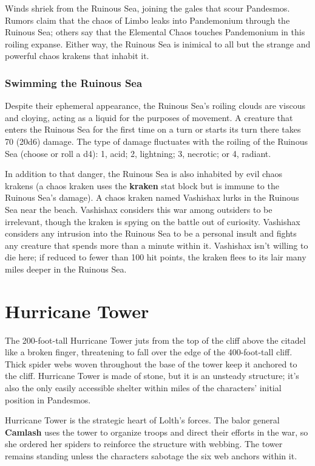 \documentclass[10pt,a4paper,twoside,bg=print,twocolumn,openany,nodeprecatedcode]{dndbook}
\begin{document}
Winds shriek from the Ruinous Sea, joining the gales that scour Pandesmos. Rumors claim that the chaos of Limbo leaks into Pandemonium through the Ruinous Sea; others say that the Elemental Chaos touches Pandemonium in this roiling expanse. Either way, the Ruinous Sea is inimical to all but the strange and powerful chaos krakens that inhabit it.

\subsubsection{Swimming the Ruinous Sea}
Despite their ephemeral appearance, the Ruinous Sea's roiling clouds are viscous and cloying, acting as a liquid for the purposes of movement. A creature that enters the Ruinous Sea for the first time on a turn or starts its turn there takes 70 (20d6) damage. The type of damage fluctuates with the roiling of the Ruinous Sea (choose or roll a d4): 1, acid; 2, lightning; 3, necrotic; or 4, radiant.

In addition to that danger, the Ruinous Sea is also inhabited by evil chaos krakens (a chaos kraken uses the \textbf{kraken} stat block but is immune to the Ruinous Sea's damage). A chaos kraken named Vashishax lurks in the Ruinous Sea near the beach. Vashishax considers this war among outsiders to be irrelevant, though the kraken is spying on the battle out of curiosity. Vashishax considers any intrusion into the Ruinous Sea to be a personal insult and fights any creature that spends more than a minute within it. Vashishax isn't willing to die here; if reduced to fewer than 100 hit points, the kraken flees to its lair many miles deeper in the Ruinous Sea.

\section{Hurricane Tower}
The 200-foot-tall Hurricane Tower juts from the top of the cliff above the citadel like a broken finger, threatening to fall over the edge of the 400-foot-tall cliff. Thick spider webs woven throughout the base of the tower keep it anchored to the cliff. Hurricane Tower is made of stone, but it is an unsteady structure; it's also the only easily accessible shelter within miles of the characters' initial position in Pandesmos.

Hurricane Tower is the strategic heart of Lolth's forces. The balor general \textbf{Camlash} uses the tower to organize troops and direct their efforts in the war, so she ordered her spiders to reinforce the structure with webbing. The tower remains standing unless the characters sabotage the six web anchors within it.
\end{document}
